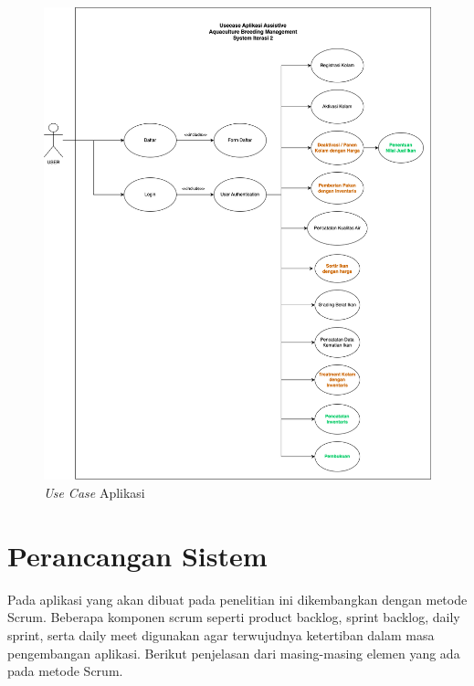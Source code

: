 \begin{figure}[H]
	\centering
	\includegraphics[width=1\textwidth]{gambar/usecase_iterasi_2.png}
	\caption{\textit{Use Case} Aplikasi}
\end{figure}

\section{Perancangan Sistem}

Pada aplikasi yang akan dibuat pada penelitian ini dikembangkan dengan metode Scrum. Beberapa komponen scrum seperti product backlog, sprint backlog, daily sprint, serta daily meet digunakan agar terwujudnya ketertiban dalam masa pengembangan aplikasi. Berikut penjelasan dari masing-masing elemen yang ada pada metode Scrum.

